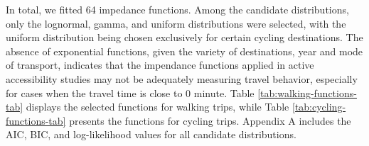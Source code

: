 \documentclass[preprint, 3p,
authoryear]{elsarticle} %
\begin{document}
In total, we fitted 64 impedance functions. Among the candidate
distributions, only the lognormal, gamma, and uniform distributions were
selected, with the uniform distribution being chosen exclusively for
certain cycling destinations. The absence of exponential functions,
given the variety of destinations, year and mode of transport, indicates
that the impendance functions applied in active accessibility studies
may not be adequately measuring travel behavior, especially for cases
when the travel time is close to 0 minute. Table
\ref{tab:walking-functions-tab} displays the selected functions for
walking trips, while Table \ref{tab:cycling-functions-tab} presents the
functions for cycling trips. Appendix A includes the AIC, BIC, and
log-likelihood values for all candidate distributions.

\begin{table}
\centering
\caption{\label{tab:selected_functions}\label{tab:walking-functions-tab}Impedance functions and AIC for walking trips.}
\centering
{}
\end{table}
\end{document}
